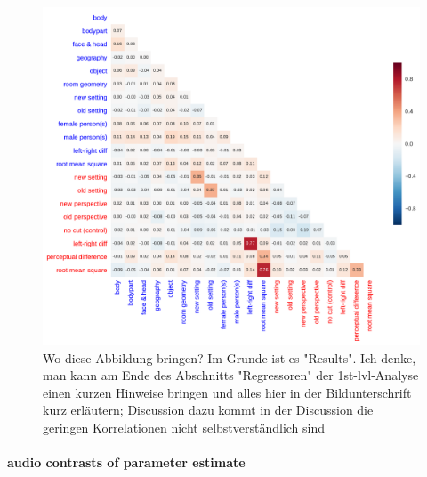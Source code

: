 \documentclass[english]{article}
\begin{document}
\begin{figure}[htbp]
  \centering
%  
  \includegraphics[width=1.0\textwidth]{regressors-corr.pdf}
  \caption{\label{fig:Rorrelation of Regressors}Wo diese Abbildung bringen? Im Grunde ist es "Results". Ich denke, man kann am Ende des Abschnitts "Regressoren" der 1st-lvl-Analyse einen kurzen Hinweise bringen und alles hier in der Bildunterschrift  kurz erläutern; Discussion dazu kommt in der Discussion die geringen Korrelationen nicht selbstverständlich sind}
\end{figure}
\paragraph{audio contrasts of parameter estimate}
\end{document}
